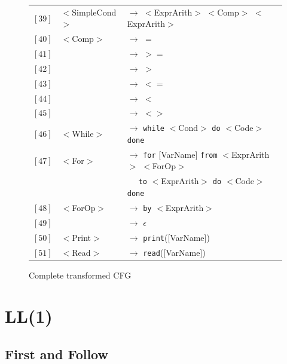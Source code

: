 \documentclass[letterpaper]{article}
\begin{document}
\begin{figure}
\begin{center}
\begin{tabular}{r l l}
                $[39]$ & $<$SimpleCond$>$ & $\rightarrow$
                $<$ExprArith$>$ $<$Comp$>$ $<$ExprArith$>$ \\
                $[40]$ & $<$Comp$>$ & $\rightarrow$ $=$ \\
                $[41]$ & & $\rightarrow$ $>=$ \\
                $[42]$ & & $\rightarrow$ $>$ \\
                $[43]$ & & $\rightarrow$ $<=$ \\
                $[44]$ & & $\rightarrow$ $<$ \\
                $[45]$ & & $\rightarrow$ $<>$ \\

                $[46]$ & $<$While$>$ & $\rightarrow$
                \texttt{while} $<$Cond$>$ \texttt{do}
                $<$Code$>$ \texttt{done} \\
                $[47]$ & $<$For$>$ & $\rightarrow$
                \texttt{for} [VarName] \texttt{from}
                $<$ExprArith$>$ $<$ForOp$>$ \\
                & &
                $\quad$ \texttt{to} $<$ExprArith$>$
                \texttt{do} $<$Code$>$ \texttt{done} \\
                $[48]$ & $<$ForOp$>$ & $\rightarrow$
                \texttt{by} $<$ExprArith$>$ \\
                $[49]$ & & $\rightarrow$ $\epsilon$ \\
                $[50]$ & $<$Print$>$ & $\rightarrow$
                \texttt{print}([VarName]) \\
                $[51]$ & $<$Read$>$ & $\rightarrow$ \texttt{read}([VarName]) \\



            \end{tabular}

    \end{center}
    \caption{Complete transformed CFG}
    \label{fig:fullcfg}
\end{figure}

\section{LL(1)}

\subsection{First and Follow}
\end{document}
